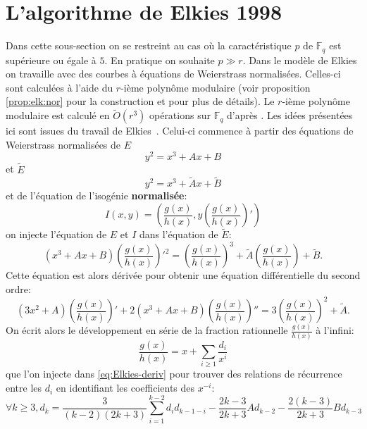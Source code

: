 \documentclass[10pt,a4paper]{book}
\theoremstyle{plain}
\theoremstyle{definition}
\theoremstyle{definition}
\theoremstyle{definition}
\theoremstyle{definition}
\theoremstyle{definition}
\theoremstyle{remark}
\theoremstyle{remark}
\theoremstyle{definition}
\begin{document}
\section{L'algorithme de Elkies 1998}
Dans cette sous-section on se restreint au cas où la caractéristique $p$ de 
$\mathbb{F}_q$ est supérieure ou égale à $5$. En pratique on souhaite $p \gg r$.
Dans le modèle de Elkies on travaille avec des courbes à équations de 
Weierstrass normalisées. Celles-ci sont calculées à l'aide du $r$-ième polynôme 
modulaire (voir proposition \ref{prop:elk:nor} pour la construction et 
\cite{Schoof95} pour plus de détails). Le $r$-ième polynôme modulaire est 
calculé en $\tilde{O}(r^3)$ opérations sur $\mathbb{F}_q$ d'après \cite{Enge09} \cite[Algorithm 6.1, Theorem 1]{BLS12}.
Les idées présentées ici sont issues du travail de Elkies~\cite[ The kernel of
 the isogeny]{Elkies1998}. Celui-ci commence à partir des équations de 
 Weierstrass normalisées de $E$
\begin{equation}
y^2=x^3+Ax+B
\end{equation}
 et $\tilde{E}$
\begin{equation}
y^2=x^3+\tilde{A}x+\tilde{B}
\end{equation}
et de l'équation de l'isogénie \textbf{normalisée}:
\begin{equation} 
I(x,y)=\left(\frac{g(x)}{h(x)},y\left( \frac{g(x)}{h(x)} \right)'\right) 
\end{equation}
on injecte l'équation de $E$ et $I$ dans l'équation de $\tilde{E}$:
\begin{equation}
(x^3+Ax+B)\left(\frac{g(x)}{h(x)} \right)'^2=  \left(\frac{g(x)}{h(x)} \right)^3 + \tilde{A} \left(\frac{g(x)}{h(x)} \right) + \tilde{B}.
\end{equation}
Cette équation est alors dérivée pour obtenir une équation différentielle du second ordre:
\begin{equation}
\label{eq:Elkies-deriv}
(3x^2+A)\left(\frac{g(x)}{h(x)} \right)'+2(x^3+Ax+B)\left(\frac{g(x)}{h(x)} \right)''=  3\left(\frac{g(x)}{h(x)} \right)^2 + \tilde{A}.
\end{equation}
On écrit alors le développement en série de la fraction rationnelle $\frac{g(x)}{h(x)}$ à l'infini:
\begin{equation}
\label{eq:iso:frac}
\frac{g(x)}{h(x)}=x+ \sum_{i\geqslant 1} \frac{d_i}{x^i}
\end{equation}
que l'on injecte dans \eqref{eq:Elkies-deriv} pour trouver des relations de récurrence entre les $d_i$ en identifiant les coefficients des $x^{-i}$:
\begin{equation}
\label{eq:rec:h_k}
\forall k \geqslant 3, d_k=\frac{3}{(k-2)(2k+3)}\sum_{i=1}^{k-2}d_id_{k-1-i}-\frac{2k-3}{2k+3}Ad_{k-2}-\frac{2(k-3)}{2k+3}Bd_{k-3} \; 
\end{equation}
\end{document}

